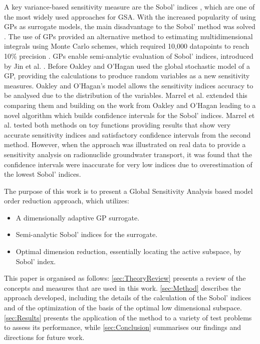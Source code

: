 \documentclass[preprint,12pt]{elsarticle}
\begin{document}
        A key variance-based sensitivity measure are the Sobol' indices \cite{Sobol2001}, which are one of the most widely used approaches for GSA. With the increased popularity of using GPs as surrogate models, the main disadvantage to the Sobol' method was solved \cite{Oakley.OHagan2004,Jin.etal2004,Marrel.etal2009}. The use of GPs provided an alternative method to estimating multidimensional integrals using Monte Carlo schemes, which required 10,000 datapoints to reach 10\% precision \cite{Lamoureux.etal2014}. GPs enable semi-analytic evaluation of Sobol' indices, introduced by Jin et al. \cite{Jin.etal2004}. Before Oakley and O'Hagan \cite{Oakley.OHagan2004} used the global stochastic model of a GP, providing the calculations to produce random variables as a new sensitivity measures. Oakley and O'Hagan's \cite{Oakley.OHagan2004} model allows the sensitivity indices accuracy to be analysed due to the distribution of the variables. Marrel et al. \cite{Marrel.etal2009} extended this comparing them and building on the work from Oakley and O'Hagan \cite{Oakley.OHagan2004} leading to a novel algorithm which builds confidence intervals for the Sobol' indices. Marrel et al. \cite{Marrel.etal2009} tested both methods on toy functions providing results that show very accurate sensitivity indices and satisfactory confidence intervals from the second method. However, when the approach was illustrated on real data to provide a sensitivity analysis on radionuclide groundwater transport, it was found that the confidence intervals were inaccurate for very low indices due to overestimation of the lowest Sobol' indices.

        The purpose of this work is to present a Global Sensitivity Analysis based model order reduction approach, which utilizes: 
        \begin{itemize}
            \item A dimensionally adaptive GP surrogate.
            \item Semi-analytic Sobol' indices for the surrogate.
            \item Optimal dimension reduction, essentially locating the active subspace, by Sobol' index.
        \end{itemize}

        This paper is organised as follows: \cref{sec:TheoryReview} presents a review of the concepts and measures that are used in this work. \cref{sec:Method} describes the approach developed, including the details of the calculation of the Sobol' indices and of the optimization of the basis of the optimal low dimensional subspace. \cref{sec:Results} presents the application of the method to a variety of test problems to assess its performance, while \cref{sec:Conclusion} summarises our findings and directions for future work. 
\end{document}
